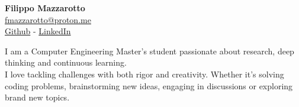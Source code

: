 \documentclass[a4paper,10pt]{article}
\begin{document}
\vfill

\begin{minipage}[t]{0.33\textwidth}
    \begin{center} 
        {\huge \textbf{Filippo Mazzarotto}} \\
        \vspace{0.2cm}
        \href{mailto:fmazzarotto+cv@proton.me}{fmazzarotto@proton.me} \\
        \vspace{0.2cm}
        \href{https://github.com/mazzatramp}{Github}
        - \href{https://www.linkedin.com/in/filippo-mazzarotto-214554176/}{LinkedIn} 
    \end{center}

\end{minipage}
\hfill
\begin{minipage}[t]{0.58\textwidth}
    \vspace{-0.45cm}
    \begin{center}
        \begin{minipage}[t]{0.9\textwidth}
            I am a Computer Engineering Master's student passionate about research, deep thinking and continuous learning. \\
                        
            I love tackling challenges with both rigor and creativity. Whether it's solving coding problems, brainstorming new ideas, engaging in discussions or exploring brand new topics. \\
        \end{minipage}
    \end{center}
\end{minipage}

\vfill
\vfill
\end{document}
